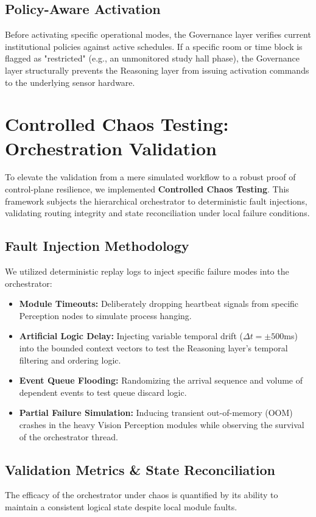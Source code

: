 \documentclass[conference]{IEEEtran}
\begin{document}
\subsection{Policy-Aware Activation}
Before activating specific operational modes, the Governance layer verifies current institutional policies against active schedules. If a specific room or time block is flagged as "restricted" (e.g., an unmonitored study hall phase), the Governance layer structurally prevents the Reasoning layer from issuing activation commands to the underlying sensor hardware.

\section{Controlled Chaos Testing: Orchestration Validation}
To elevate the validation from a mere simulated workflow to a robust proof of control-plane resilience, we implemented \textbf{Controlled Chaos Testing}. This framework subjects the hierarchical orchestrator to deterministic fault injections, validating routing integrity and state reconciliation under local failure conditions.

\subsection{Fault Injection Methodology}
We utilized deterministic replay logs to inject specific failure modes into the orchestrator:
\begin{itemize}
    \item \textbf{Module Timeouts:} Deliberately dropping heartbeat signals from specific Perception nodes to simulate process hanging.
    \item \textbf{Artificial Logic Delay:} Injecting variable temporal drift ($\Delta t = \pm 500$ms) into the bounded context vectors to test the Reasoning layer's temporal filtering and ordering logic.
    \item \textbf{Event Queue Flooding:} Randomizing the arrival sequence and volume of dependent events to test queue discard logic.
    \item \textbf{Partial Failure Simulation:} Inducing transient out-of-memory (OOM) crashes in the heavy Vision Perception modules while observing the survival of the orchestrator thread.
\end{itemize}

\subsection{Validation Metrics \& State Reconciliation}
The efficacy of the orchestrator under chaos is quantified by its ability to maintain a consistent logical state despite local module faults.
\end{document}
